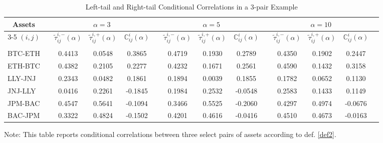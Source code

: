 \documentclass{article}
\begin{document}
\begin{table}[H]\centering
\scriptsize
\caption{Left-tail and Right-tail Conditional Correlations in a 3-pair Example}\label{tab:illus}
\begin{threeparttable}
\begin{tabular}{cccccccccccccc}\toprule
 \multirow{2}{*}{Assets}  & &\multicolumn{3}{c}{$\alpha = 3$} & &\multicolumn{3}{c}{$\alpha = 5$} & &\multicolumn{3}{c}{$\alpha = 10$} \\\cmidrule{3-5}\cmidrule{7-9}\cmidrule{11-13}
$(i,j)$ & & $\tilde{\tau}^{i,-}_{ij}(\alpha)$ & $\tilde{\tau}^{i,+}_{ij}(\alpha)$ & $\mathbb{C}^i_{ij}(\alpha)$ & & $\tilde{\tau}^{i,-}_{ij}(\alpha)$ & $\tilde{\tau}^{i,+}_{ij}(\alpha)$ & $\mathbb{C}^i_{ij}(\alpha)$ & & $\tilde{\tau}^{i,-}_{ij}(\alpha)$ & $\tilde{\tau}^{i,+}_{ij}(\alpha)$ & $\mathbb{C}^i_{ij}(\alpha)$   \\\midrule
& & & & & & \\[-2mm]
\multicolumn{1}{l}{BTC-ETH}     &  & 0.4413 & 0.0548 & 0.3865 & & 0.4719 & 0.1930 & 0.2789 & & 0.4350 & 0.1902 & 0.2447  \\[1mm]
\multicolumn{1}{l}{ETH-BTC}     &  & 0.4382 & 0.2105 & 0.2277 & & 0.4232 & 0.1671 & 0.2561 & & 0.4590 & 0.1432 & 0.3158 \\[2.5mm]

\multicolumn{1}{l}{LLY-JNJ}   &  &  0.2343 & 0.0482 & 0.1861 & & 0.1894 & 0.0039 & 0.1855 & & 0.1782 & 0.0652 & 0.1130 \\[1mm]
\multicolumn{1}{l}{JNJ-LLY}   &  & 0.0416 & 0.2261 & -0.1845 & & 0.1984 & 0.2532 & -0.0548 & & 0.2583 & 0.1433 & 0.1149 \\[2.5mm]

\multicolumn{1}{l}{JPM-BAC}     &  & 0.4547 & 0.5641 & -0.1094 & & 0.3466 & 0.5525 & -0.2060 & & 0.4297 & 0.4974 & -0.0676 \\[1mm]
\multicolumn{1}{l}{BAC-JPM}     &  & 0.3322 & 0.4824 & -0.1502 & & 0.4201 & 0.4616 & -0.0416 & & 0.4510 & 0.4673 & -0.0163 \\
\bottomrule
\end{tabular}
\begin{tablenotes}      
\item Note: This table reports conditional correlations between three select pairs of assets according to def. \ref{def2}. 
\end{tablenotes}
\end{threeparttable}
\end{table}
\end{document}
